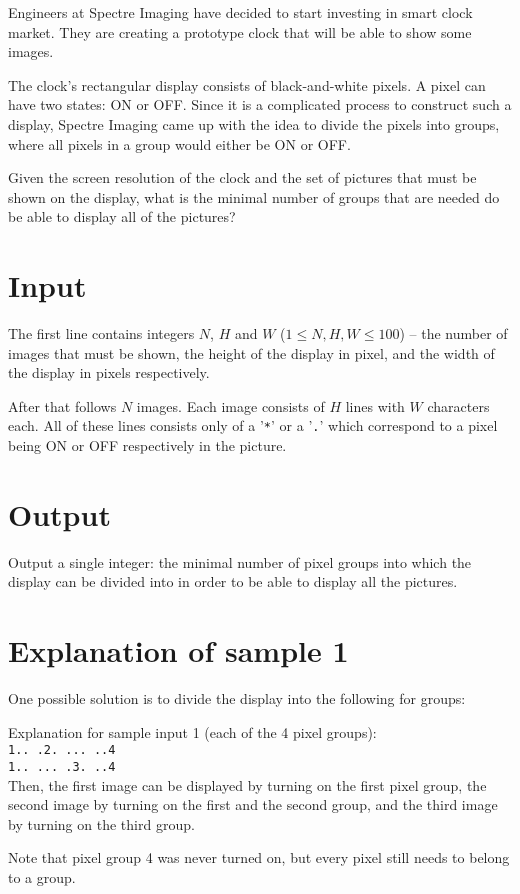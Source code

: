Engineers at Spectre Imaging have decided to start investing in smart clock market.
They are creating a prototype clock that will be able to show some images.

The clock's rectangular display consists of black-and-white pixels.
A pixel can have two states: ON or OFF.
Since it is a complicated process to construct such a display, Spectre Imaging came up with the idea to divide the pixels into groups, where all pixels in a group would either be ON or OFF.

Given the screen resolution of the clock and the set of pictures that must be shown on the display, what is the minimal number of groups that are needed do be able to display all of the pictures?

\section*{Input}
The first line contains integers $N$, $H$ and $W$ ($1 \leq N, H, W \leq 100$) -- the number of images that must be shown, the height of the display in pixel, and the width of the display in pixels respectively.

After that follows $N$ images.
Each image consists of $H$ lines with $W$ characters each.
All of these lines consists only of a '\texttt{*}' or a '\texttt{.}' which correspond to a pixel being ON or OFF respectively in the picture.

\section*{Output}
Output a single integer: the minimal number of pixel groups into which the display can be divided into in order to be able to display all the pictures.

\section*{Explanation of sample 1}
One possible solution is to divide the display into the following for groups:

Explanation for sample input 1 (each of the 4 pixel groups): \\
\texttt{1.. .2. ... ..4} \\
\texttt{1.. ... .3. ..4} \\

Then, the first image can be displayed by turning on the first pixel group, the second image by turning on the first and the second group, and the third image by turning on the third group.

Note that pixel group 4 was never turned on, but every pixel still needs to belong to a group.
